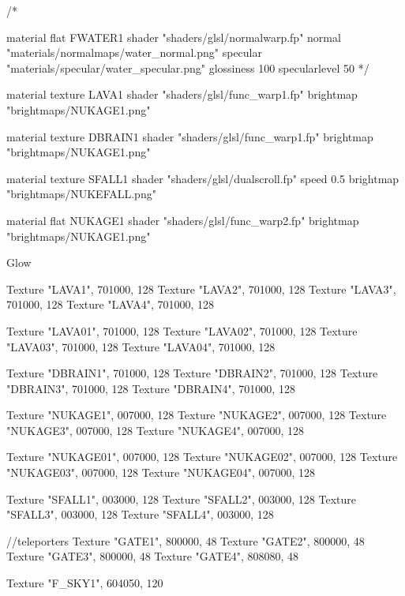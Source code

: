 /*

material flat FWATER1 {
	shader "shaders/glsl/normalwarp.fp"
	normal "materials/normalmaps/water_normal.png"
	specular "materials/specular/water_specular.png"
	glossiness 100
	specularlevel 50
}*/

material texture LAVA1 {
	shader "shaders/glsl/func_warp1.fp"
	brightmap "brightmaps/NUKAGE1.png"
}

material texture DBRAIN1 {
	shader "shaders/glsl/func_warp1.fp"
	brightmap "brightmaps/NUKAGE1.png"
}

material texture SFALL1 {
	shader "shaders/glsl/dualscroll.fp"
	speed 0.5
	brightmap "brightmaps/NUKEFALL.png"
}

material flat NUKAGE1 {
	shader "shaders/glsl/func_warp2.fp"
	brightmap "brightmaps/NUKAGE1.png"
}

Glow {
	Texture "LAVA1", 701000, 128
	Texture "LAVA2", 701000, 128
	Texture "LAVA3", 701000, 128
	Texture "LAVA4", 701000, 128
	
	Texture "LAVA01", 701000, 128
	Texture "LAVA02", 701000, 128
	Texture "LAVA03", 701000, 128
	Texture "LAVA04", 701000, 128
	
	Texture "DBRAIN1", 701000, 128
	Texture "DBRAIN2", 701000, 128
	Texture "DBRAIN3", 701000, 128
	Texture "DBRAIN4", 701000, 128
	
	Texture "NUKAGE1", 007000, 128
	Texture "NUKAGE2", 007000, 128
	Texture "NUKAGE3", 007000, 128
	Texture "NUKAGE4", 007000, 128
	
	Texture "NUKAGE01", 007000, 128
	Texture "NUKAGE02", 007000, 128
	Texture "NUKAGE03", 007000, 128
	Texture "NUKAGE04", 007000, 128
	
	Texture "SFALL1", 003000, 128
	Texture "SFALL2", 003000, 128
	Texture "SFALL3", 003000, 128
	Texture "SFALL4", 003000, 128
	
	//teleporters
	Texture "GATE1", 800000, 48
	Texture "GATE2", 800000, 48
	Texture "GATE3", 800000, 48
	Texture "GATE4", 808080, 48
	
	Texture "F_SKY1", 604050, 120
}
